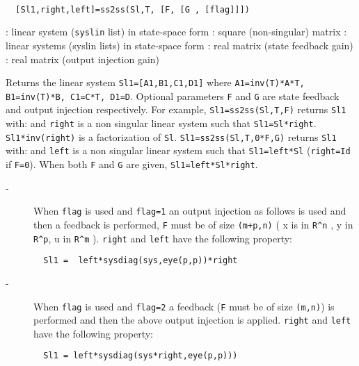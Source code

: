 \begin{mandesc}
   \\ %
\end{mandesc}
\begin{calling_sequence}
\begin{verbatim}
  [Sl1,right,left]=ss2ss(Sl,T, [F, [G , [flag]]])  
\end{verbatim}
\end{calling_sequence}
\begin{parameters}
  \begin{varlist}
    : linear system (\verb!syslin! list) in state-space form
    : square (non-singular) matrix
    : linear systems (syslin lists) in state-space form
    : real matrix (state feedback gain)
    : real matrix (output injection gain)
  \end{varlist}
\end{parameters}
\begin{mandescription}
  Returns the linear system \verb!Sl1=[A1,B1,C1,D1]!
  where \verb!A1=inv(T)*A*T, B1=inv(T)*B, C1=C*T, D1=D!.
  Optional parameters \verb!F! and \verb!G! are state feedback
  and output injection respectively. 
  For example,
  \verb!Sl1=ss2ss(Sl,T,F)! returns \verb!Sl1! with:
  and \verb!right! is a non singular linear system such that \verb!Sl1=Sl*right!.
  \verb!Sl1*inv(right)! is a factorization of \verb!Sl!.
  \verb!Sl1=ss2ss(Sl,T,0*F,G)! returns \verb!Sl1! with:
  and \verb!left! is a non singular linear system such that \verb!Sl1=left*Sl! (\verb!right=Id! if \verb!F=0!).
  When both \verb!F! and \verb!G! are given, \verb!Sl1=left*Sl*right!.
  \begin{description}
  \item[-] When \verb!flag! is used and \verb!flag=1! an output injection  as follows is used 
    and then a feedback is performed, \verb!F! must be of size \verb!(m+p,n)!
    ( x is in \verb!R^n! , y in \verb!R^p!, u in \verb!R^m! ). 
    \verb!right! and \verb!left! have the following property:
\begin{verbatim}
  Sl1 =  left*sysdiag(sys,eye(p,p))*right 
\end{verbatim}
\item[-] When \verb!flag! is used and \verb!flag=2! a feedback
  (\verb!F! must be of  size \verb!(m,n)!) is performed
  and then the above output injection is applied. \verb!right!
  and \verb!left! have  the following property:
\begin{verbatim}
  Sl1 = left*sysdiag(sys*right,eye(p,p)))
\end{verbatim}
\end{description}
\end{mandescription}
